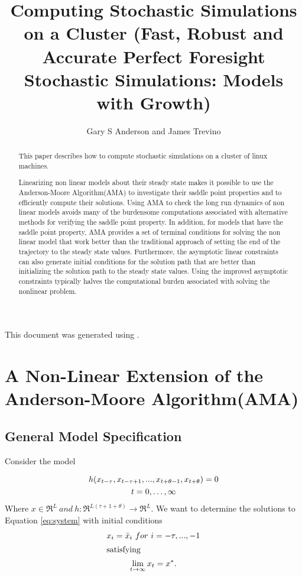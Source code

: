 \documentclass[12pt]{article}
\title{Computing Stochastic Simulations on a Cluster ({Fast, Robust and Accurate Perfect Foresight Stochastic Simulations: Models with Growth})}
\author{Gary S Anderson and James Trevino}
\begin{document}
\maketitle


This document was generated using \currfilename.

  \begin{abstract}
This paper describes how to compute stochastic simulations on a cluster of linux machines.

Linearizing non linear models about their steady state makes it possible
to use the Anderson-Moore Algorithm(AMA) to investigate their saddle point 
properties and to efficiently compute their solutions.
Using AMA to check the long run dynamics 
of non linear  models 
avoids many of the burdensome computations associated with 
alternative methods for verifying the saddle point property.
In addition,
 for models that have the saddle point property, AMA provides a set of 
terminal conditions for solving the non linear model
that work better than the traditional approach of 
setting the end of the trajectory to the steady state values.
Furthermore, the 
asymptotic linear constraints can also generate initial conditions
for the solution path
that are better than initializing the solution path to the steady
state values.
Using the improved asymptotic constraints typically halves the computational
burden associated with solving the nonlinear problem.
  \end{abstract}

\newpage
\tableofcontents


\section{A Non-Linear Extension of the Anderson-Moore Algorithm(AMA)}

\subsection{  General Model Specification}
          Consider the model
            

\begin{gather}
          h(x_{t-\tau}  , x_{t-\tau+1}     ,..., x_{t+\theta-1}     , x_{t+\theta}   ) = 0  \label{eq:system}\\
          t = 0,\ldots, \infty\notag
\end{gather}
Where $x \in \Re^L~and~ h:\Re^{L(\tau+1+\theta)} \rightarrow \Re^L$.
We want to determine the solutions to Equation  \ref{eq:system} 
with initial conditions
          \begin{gather}
          x_i  = \bar{x}_i~ for~ i = - \tau,...,-1 \label{eq:sysInit}\\
\intertext{satisfying}
          \lim_{t \rightarrow \infty}   x_{t}  = x^\ast.\label{eq:sysLim}
\end{gather}
\end{document}
